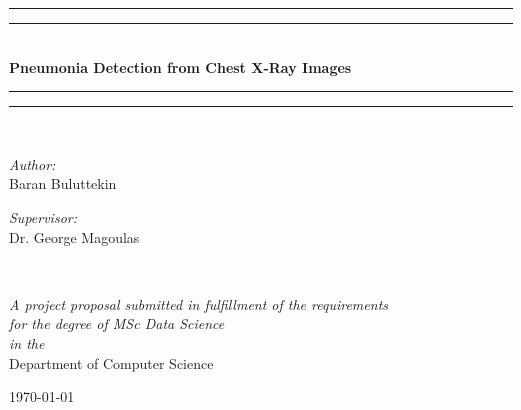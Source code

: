 \documentclass[12pt, twoside, a4paper]{article}
\begin{document}
\begin{titlepage}
    \begin{center}
        \vspace*{.06\textheight}{\scshape\LARGE Birkbeck, University of London\par}\vspace{1.5cm} %
        \rule[0.5ex]{\linewidth}{2pt}\vspace*{-\baselineskip}\vspace*{3.2pt}
        \rule[0.5ex]{\linewidth}{1pt}\\[\baselineskip]
        \huge{\bfseries Pneumonia Detection from Chest X-Ray Images}\\[4mm]
        \rule[0.5ex]{\linewidth}{1pt}\vspace*{-\baselineskip}\vspace{3.2pt}
        \rule[0.5ex]{\linewidth}{2pt}\\
        [1.5cm]


        \begin{minipage}[t]{0.4\textwidth}
        \begin{flushleft} \large
        \emph{Author:}\\
        {Baran Buluttekin} %
        \end{flushleft}
        \end{minipage}
        \begin{minipage}[t]{0.4\textwidth}
        \begin{flushright} \large
        \emph{Supervisor:} \\
        {Dr. George Magoulas} %
        \end{flushright}
        \end{minipage}\\
        [3cm]

            \vfill

            \large \textit{A project proposal submitted in fulfillment of the requirements\\ for the degree of MSc Data Science}\\[0.3cm] %
            \textit{in the}\\[0.4cm]
            Department of Computer Science\\[2cm] %
 
            \vfill

            {\large \today}\\[4cm] %
 
            \vfill
    \end{center}
\end{titlepage}    
\thispagestyle{empty}
\cleardoublepage
\end{document}
